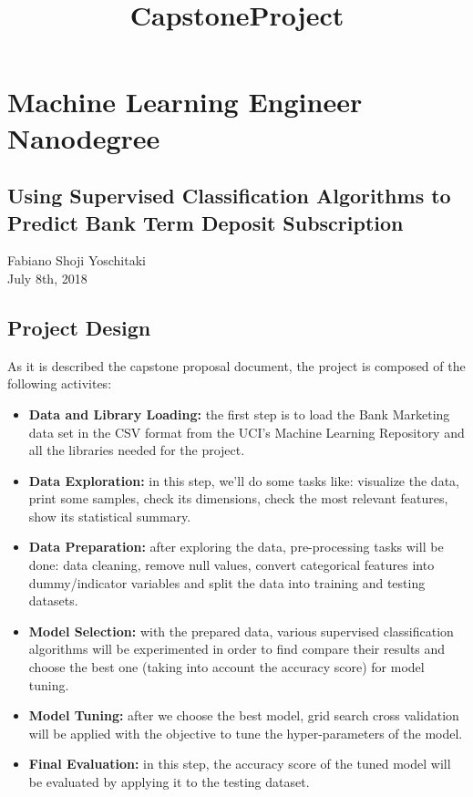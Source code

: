\documentclass[11pt]{article}
\title{CapstoneProject}
\begin{document}
    
    
    \maketitle
    
    

    
    \section{Machine Learning Engineer
Nanodegree}\label{machine-learning-engineer-nanodegree}

\subsection{Using Supervised Classification Algorithms to Predict Bank
Term Deposit
Subscription}\label{using-supervised-classification-algorithms-to-predict-bank-term-deposit-subscription}

Fabiano Shoji Yoschitaki\\
July 8th, 2018

\subsection{Project Design}\label{project-design}

As it is described the capstone proposal document, the project is
composed of the following activites:

\begin{itemize}
\item
  \textbf{Data and Library Loading: } the first step is to load the Bank
  Marketing data set in the CSV format from the UCI's Machine Learning
  Repository and all the libraries needed for the project.
\item
  \textbf{Data Exploration: } in this step, we'll do some tasks like:
  visualize the data, print some samples, check its dimensions, check
  the most relevant features, show its statistical summary.
\item
  \textbf{Data Preparation: } after exploring the data, pre-processing
  tasks will be done: data cleaning, remove null values, convert
  categorical features into dummy/indicator variables and split the data
  into training and testing datasets.
\item
  \textbf{Model Selection: } with the prepared data, various supervised
  classification algorithms will be experimented in order to find
  compare their results and choose the best one (taking into account the
  accuracy score) for model tuning.
\item
  \textbf{Model Tuning: } after we choose the best model, grid search
  cross validation will be applied with the objective to tune the
  hyper-parameters of the model.
\item
  \textbf{Final Evaluation: } in this step, the accuracy score of the
  tuned model will be evaluated by applying it to the testing dataset.
\end{itemize}
\end{document}
